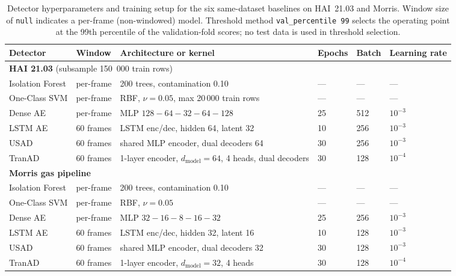 \begin{table}[h]
\centering
\caption{Detector hyperparameters and training setup for the six same-dataset baselines on HAI~21.03 and Morris.  Window size of \texttt{null} indicates a per-frame (non-windowed) model.  Threshold method \texttt{val\_percentile~99} selects the operating point at the 99th percentile of the validation-fold scores; no test data is used in threshold selection.}
\label{tab:hyperparams}
\small
\begin{tabular}{lp{2.5cm}p{4.5cm}lll}
\toprule
Detector & Window & Architecture or kernel & Epochs & Batch & Learning rate \\
\midrule
\multicolumn{6}{l}{\textbf{HAI 21.03} (subsample 150~000 train rows)} \\
Isolation Forest & per-frame & 200 trees, contamination 0.10        & ---  & ---  & --- \\
One-Class SVM    & per-frame & RBF, $\nu=0.05$, max 20\,000 train rows & ---  & ---  & --- \\
Dense AE         & per-frame & MLP $128{-}64{-}32{-}64{-}128$        & 25   & 512  & $10^{-3}$ \\
LSTM AE          & 60 frames & LSTM enc/dec, hidden 64, latent 32    & 10   & 256  & $10^{-3}$ \\
USAD             & 60 frames & shared MLP encoder, dual decoders 64  & 30   & 256  & $10^{-3}$ \\
TranAD           & 60 frames & 1-layer encoder, $d_{\text{model}}=64$, 4 heads, dual decoders & 30 & 128 & $10^{-4}$ \\
\midrule
\multicolumn{6}{l}{\textbf{Morris gas pipeline}} \\
Isolation Forest & per-frame & 200 trees, contamination 0.10         & ---  & ---  & --- \\
One-Class SVM    & per-frame & RBF, $\nu=0.05$                       & ---  & ---  & --- \\
Dense AE         & per-frame & MLP $32{-}16{-}8{-}16{-}32$           & 25   & 256  & $10^{-3}$ \\
LSTM AE          & 60 frames & LSTM enc/dec, hidden 32, latent 16    & 10   & 128  & $10^{-3}$ \\
USAD             & 60 frames & shared MLP encoder, dual decoders 32  & 30   & 128  & $10^{-3}$ \\
TranAD           & 60 frames & 1-layer encoder, $d_{\text{model}}=32$, 4 heads & 30 & 128 & $10^{-4}$ \\
\bottomrule
\end{tabular}
\end{table}

